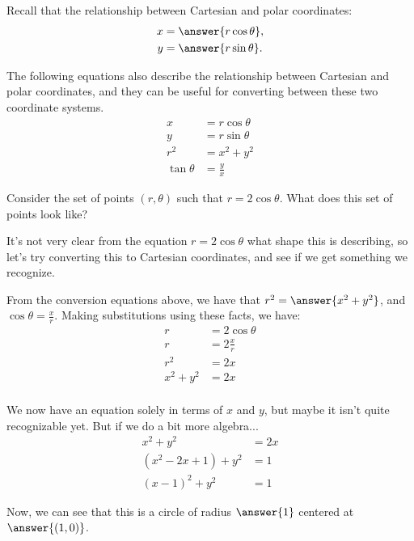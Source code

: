 \documentclass{ximera}
\begin{document}
Recall that the relationship between Cartesian and polar coordinates:
\begin{align*}
x &= \answer{r\cos\theta},\\
y &= \answer{r\sin\theta}.
\end{align*}

The following equations also describe the relationship between Cartesian and polar coordinates, and they can be useful for converting between these two coordinate systems.
\begin{align*}
x &= r\cos\theta\\
y &= r\sin\theta\\
r^2 &= x^2 +y^2\\
\tan\theta &= \frac{y}{x}
\end{align*}

\begin{example}
Consider the set of points $(r,\theta)$ such that $r = 2\cos\theta$. What does this set of points look like?

It's not very clear from the equation $r=2\cos\theta$ what shape this is describing, so let's try converting this to Cartesian coordinates, and see if we get something we recognize.

From the conversion equations above, we have that $r^2 = \answer{x^2+y^2}$, and $\cos\theta = \frac{x}{r}$. Making substitutions using these facts, we have:
\begin{align*}
r &= 2\cos\theta\\
r &= 2\frac{x}{r}\\
r^2 &= 2x\\
x^2+y^2 &= 2x\\
\end{align*}

We now have an equation solely in terms of $x$ and $y$, but maybe it isn't quite recognizable yet. But if we do a bit more algebra...
\begin{align*}
x^2 + y^2 &= 2x\\
(x^2-2x+1) + y^2 &= 1\\
(x-1)^2 + y^2 &=1
\end{align*}

Now, we can see that this is a circle of radius $\answer{1}$ centered at $\answer{(1,0)}$.

\begin{image}
\end{image}

\end{example}
\end{document}
